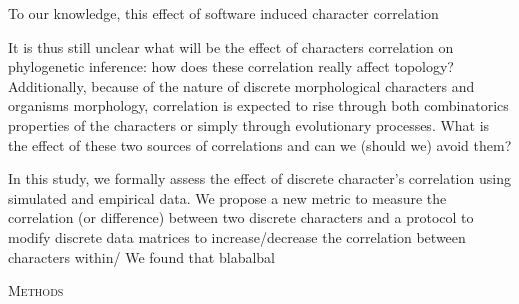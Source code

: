 \documentclass[12pt,letterpaper]{article}
\renewcommand{\section}[1]{%
\bigskip
\begin{center}
\begin{Large}
\normalfont\scshape #1
\medskip
\end{Large}
\end{center}}
\begin{document}
To our knowledge, this effect of software induced character correlation 

It is thus still unclear what will be the effect of characters correlation on phylogenetic inference: how does these correlation really affect topology?
Additionally, because of the nature of discrete morphological characters and organisms morphology, correlation is expected to rise through both combinatorics properties of the characters or simply through evolutionary processes.
What is the effect of these two sources of correlations and can we (should we) avoid them?

In this study, we formally assess the effect of discrete character's correlation using simulated and empirical data.
We propose a new metric to measure the correlation (or difference) between two discrete characters and a protocol to modify discrete data matrices to increase/decrease the correlation between characters within/
We found that blabalbal




\section{Methods}
\end{document}
